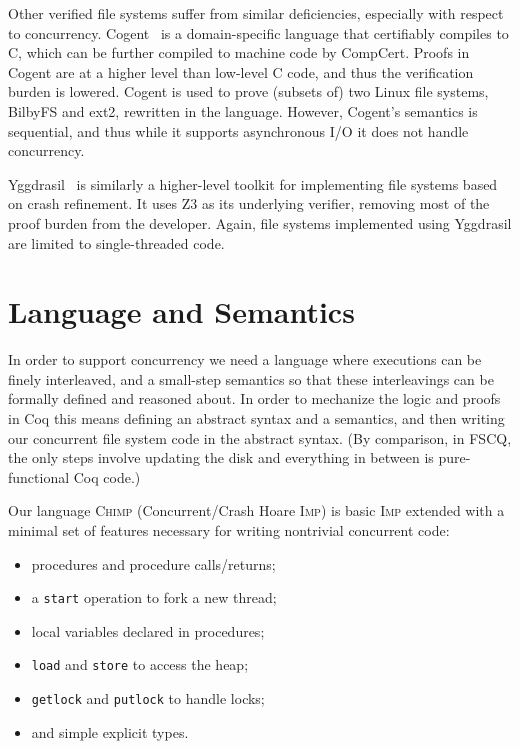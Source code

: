 Other verified file systems suffer from similar deficiencies, especially with
respect to concurrency.
Cogent~\cite{amani2016cogent} is a domain-specific
language that certifiably compiles to C, which can be further compiled to
machine code by CompCert.
Proofs in Cogent are at a higher level than low-level
C code, and thus the verification burden is lowered.
Cogent is used to prove
(subsets of) two Linux file systems, BilbyFS and ext2, rewritten in the
language.
However, Cogent's semantics is sequential, and thus while it
supports asynchronous I/O it does not handle concurrency.

Yggdrasil~\cite{sigurbjarnarson2016push} is similarly a higher-level toolkit for
implementing file systems based on crash refinement.
It uses Z3 as its underlying
verifier, removing most of the proof burden from the developer.
Again, file
systems implemented using Yggdrasil are limited to single-threaded code.


\section{Language and Semantics}
\label{sec:semantics}

In order to support concurrency we need a language where executions
can be finely interleaved, and a small-step semantics so that these
interleavings can be formally defined and reasoned about.
In order to mechanize the logic and proofs in Coq this means defining
an abstract syntax and a semantics, and then writing our concurrent
file system code in the abstract syntax.
(By comparison, in FSCQ, the only steps involve updating the disk and
everything in between is pure-functional Coq code.)

Our language \textsc{Chimp} (Concurrent/Crash Hoare \textsc{Imp}) is
basic \textsc{Imp} extended with a minimal set of features necessary
for writing nontrivial concurrent code:
\begin{itemize}
\item procedures and procedure calls/returns;
\item a \texttt{start} operation to fork a new thread;
\item local variables declared in procedures;
\item \texttt{load} and \texttt{store} to access the heap;
\item \texttt{getlock} and \texttt{putlock} to handle locks;
\item and simple explicit types.
\end{itemize}

